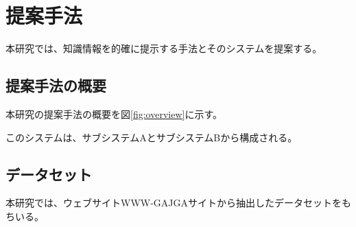 \chapter{提案手法}
\label{chap:method}

本研究では、知識情報を的確に提示する手法とそのシステムを提案する。

\section{提案手法の概要}

本研究の提案手法の概要を図\ref{fig:overview}に示す。

このシステムは、サブシステムAとサブシステムBから構成される。


\section{データセット}

本研究では、ウェブサイトWWW-GAJGAサイト\cite{website}から抽出したデータセットをもちいる。

